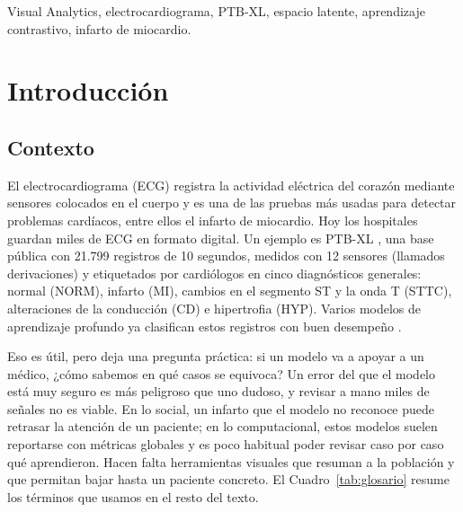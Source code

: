 \documentclass[conference]{IEEEtran}
\begin{document}
\begin{IEEEkeywords}
Visual Analytics, electrocardiograma, PTB-XL, espacio latente, aprendizaje contrastivo, infarto de miocardio.
\end{IEEEkeywords}

\section{Introducción}

\subsection{Contexto}
El electrocardiograma (ECG) registra la actividad eléctrica del corazón mediante sensores colocados en el cuerpo y es una de las pruebas más usadas para detectar problemas cardíacos, entre ellos el infarto de miocardio. Hoy los hospitales guardan miles de ECG en formato digital. Un ejemplo es PTB-XL \cite{wagner}, una base pública con 21.799 registros de 10 segundos, medidos con 12 sensores (llamados derivaciones) y etiquetados por cardiólogos en cinco diagnósticos generales: normal (NORM), infarto (MI), cambios en el segmento ST y la onda T (STTC), alteraciones de la conducción (CD) e hipertrofia (HYP). Varios modelos de aprendizaje profundo ya clasifican estos registros con buen desempeño \cite{strodthoff}.

Eso es útil, pero deja una pregunta práctica: si un modelo va a apoyar a un médico, ¿cómo sabemos en qué casos se equivoca? Un error del que el modelo está muy seguro es más peligroso que uno dudoso, y revisar a mano miles de señales no es viable. En lo social, un infarto que el modelo no reconoce puede retrasar la atención de un paciente; en lo computacional, estos modelos suelen reportarse con métricas globales y es poco habitual poder revisar caso por caso qué aprendieron. Hacen falta herramientas visuales que resuman a la población y que permitan bajar hasta un paciente concreto. El Cuadro~\ref{tab:glosario} resume los términos que usamos en el resto del texto.
\end{document}
